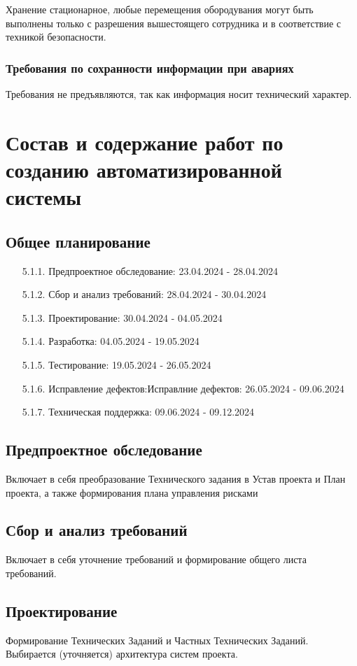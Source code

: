 \documentclass[16pt,a4paper]{article}
\begin{document}
Хранение стационарное, любые перемещения обородувания могут быть выполнены только с разрешения вышестоящего сотрудника и в соответствие с техникой безопасности.
\subsubsection{Требования по сохранности информации при авариях}
Требования не предъявляются, так как информация носит технический характер.
\section{Состав и содержание работ по созданию автоматизированной системы}
\subsection{Общее планирование}
\begin{enumerate}
    \item [5.1.1.] Предпроектное обследование: 23.04.2024 - 28.04.2024
    \item [5.1.2.] Сбор и анализ требований: 28.04.2024 - 30.04.2024
    \item [5.1.3.] Проектирование: 30.04.2024 - 04.05.2024
    \item [5.1.4.] Разработка: 04.05.2024 - 19.05.2024
    \item [5.1.5.] Тестирование: 19.05.2024 - 26.05.2024
    \item [5.1.6.] Исправление дефектов:Исправлние дефектов: 26.05.2024 - 09.06.2024
    \item [5.1.7.] Техническая поддержка: 09.06.2024 - 09.12.2024
\end{enumerate}
\subsection{Предпроектное обследование}
Включает в себя преобразование Технического задания в Устав проекта и План проекта, а также формирования плана управления рисками
\subsection{Сбор и анализ требований}
Включает в себя уточнение требований и формирование общего листа требований.
\subsection{Проектирование}
Формирование Технических Заданий и Частных Технических Заданий. Выбирается (уточняется) архитектура систем проекта.
\end{document}
